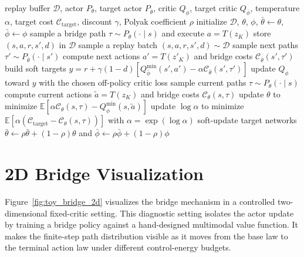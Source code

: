 \documentclass[11pt]{article}
\newcommand{\myalgo}{\texttt{SoftGAC}\xspace}
\begin{document}
\begin{algorithm}[H]
\caption{\myalgo off-policy training}
\label{alg:softgac}
\begin{algorithmic}[1]
\Require replay buffer $\mathcal D$, actor $P_\theta$, target actor $P_{\bar\theta}$, critic $Q_\phi$, target critic $Q_{\bar\phi}$, temperature $\alpha$, target cost $\mathcal C_{\mathrm{target}}$, discount $\gamma$, Polyak coefficient $\rho$
\State initialize $\mathcal D$, $\theta$, $\phi$, $\bar\theta\leftarrow\theta$, $\bar\phi\leftarrow\phi$
  \State sample a bridge path $\tau\sim P_\theta(\cdot\mid s)$ and execute $a=T(z_K)$
  \State store $(s,a,r,s',d)$ in $\mathcal D$
    \State sample a replay batch $(s,a,r,s',d)\sim\mathcal D$
    \State sample next paths $\tau'\sim P_{\bar\theta}(\cdot\mid s')$
    \State compute next actions $a'=T(z'_K)$ and bridge costs $\mathcal C_{\bar\theta}(s',\tau')$
    \State build soft targets $y=r+\gamma(1-d)\left[Q_{\bar\phi}^{\min}(s',a')-\alpha\mathcal C_{\bar\theta}(s',\tau')\right]$
    \State update $Q_\phi$ toward $y$ with the chosen off-policy critic loss
      \State sample current paths $\tau\sim P_\theta(\cdot\mid s)$
      \State compute current actions $\tilde a=T(z_K)$ and bridge costs $\mathcal C_\theta(s,\tau)$
      \State update $\theta$ to minimize $\mathbb E[\alpha\mathcal C_\theta(s,\tau)-Q_\phi^{\min}(s,\tilde a)]$
      \State update $\log\alpha$ to minimize $\mathbb E[\alpha(\mathcal C_{\mathrm{target}}-\mathcal C_\theta(s,\tau))]$ with $\alpha=\exp(\log\alpha)$
    \EndIf
      \State soft-update target networks $\bar\theta\leftarrow\rho\bar\theta+(1-\rho)\theta$ and $\bar\phi\leftarrow\rho\bar\phi+(1-\rho)\phi$
    \EndIf
  \EndFor
\EndFor
\end{algorithmic}
\end{algorithm}


\section{2D Bridge Visualization}
\label{app:controlled_2d}

Figure~\ref{fig:toy_bridge_2d} visualizes the bridge mechanism in a controlled two-dimensional fixed-critic setting. This diagnostic setting isolates the actor update by training a bridge policy against a hand-designed multimodal value function. It makes the finite-step path distribution visible as it moves from the base law to the terminal action law under different control-energy budgets.
\end{document}
